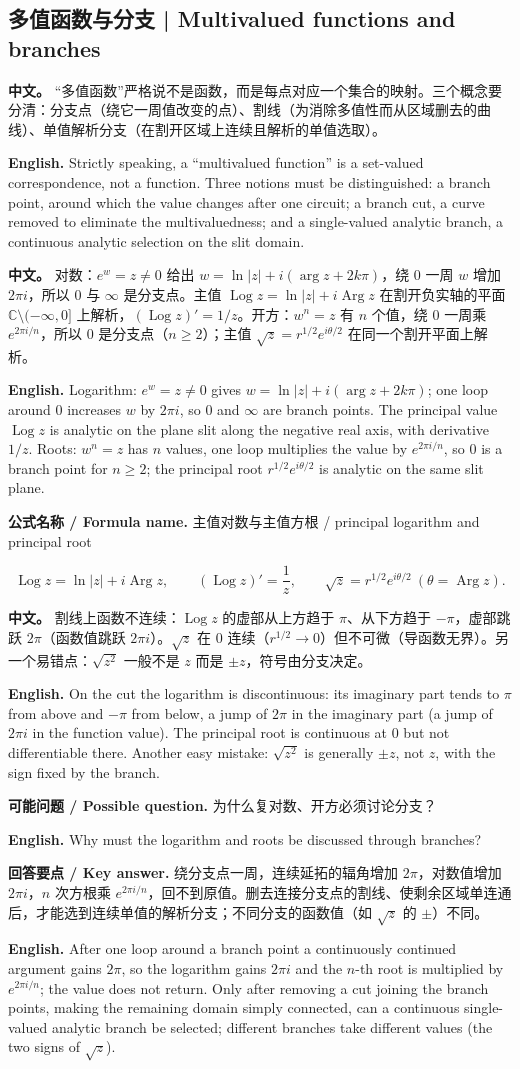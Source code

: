 \documentclass[UTF8,11pt,a4paper]{ctexart}
\newcommand{\EN}[1]{\par\noindent \textbf{English.} #1\par}
\newcommand{\FORMULA}[2]{\par\noindent\textbf{公式名称 / Formula name.} #1 / #2\par}
\newcommand{\ASK}[4]{\par\noindent \textbf{可能问题 / Possible question.} #1\par\EN{#2}\noindent \textbf{回答要点 / Key answer.} #3\par\EN{#4}\medskip}
\newcommand{\APS}[2]{\par\noindent\textbf{中文。} #1\par\noindent\textbf{English.} #2\par\smallskip}
\begin{document}
\subsection{多值函数与分支 | Multivalued functions and branches}
\APS{“多值函数”严格说不是函数，而是每点对应一个集合的映射。三个概念要分清：分支点（绕它一周值改变的点）、割线（为消除多值性而从区域删去的曲线）、单值解析分支（在割开区域上连续且解析的单值选取）。}{Strictly speaking, a ``multivalued function'' is a set-valued correspondence, not a function. Three notions must be distinguished: a branch point, around which the value changes after one circuit; a branch cut, a curve removed to eliminate the multivaluedness; and a single-valued analytic branch, a continuous analytic selection on the slit domain.}
\APS{对数：$e^w=z\ne0$ 给出 $w=\ln|z|+i(\arg z+2k\pi)$，绕 $0$ 一周 $w$ 增加 $2\pi i$，所以 $0$ 与 $\infty$ 是分支点。主值 $\operatorname{Log}z=\ln|z|+i\operatorname{Arg}z$ 在割开负实轴的平面 $\mathbb C\setminus(-\infty,0]$ 上解析，$(\operatorname{Log}z)'=1/z$。开方：$w^n=z$ 有 $n$ 个值，绕 $0$ 一周乘 $e^{2\pi i/n}$，所以 $0$ 是分支点（$n\ge2$）；主值 $\sqrt z=r^{1/2}e^{i\theta/2}$ 在同一个割开平面上解析。}{Logarithm: $e^w=z\ne0$ gives $w=\ln|z|+i(\arg z+2k\pi)$; one loop around $0$ increases $w$ by $2\pi i$, so $0$ and $\infty$ are branch points. The principal value $\operatorname{Log}z$ is analytic on the plane slit along the negative real axis, with derivative $1/z$. Roots: $w^n=z$ has $n$ values, one loop multiplies the value by $e^{2\pi i/n}$, so $0$ is a branch point for $n\ge2$; the principal root $r^{1/2}e^{i\theta/2}$ is analytic on the same slit plane.}
\FORMULA{主值对数与主值方根}{principal logarithm and principal root}
\[
\operatorname{Log}z=\ln|z|+i\operatorname{Arg}z,\qquad (\operatorname{Log}z)'=\frac1z,\qquad
\sqrt z=r^{1/2}e^{i\theta/2}\ (\theta=\operatorname{Arg}z).
\]
\APS{割线上函数不连续：$\operatorname{Log}z$ 的虚部从上方趋于 $\pi$、从下方趋于 $-\pi$，虚部跳跃 $2\pi$（函数值跳跃 $2\pi i$）。$\sqrt z$ 在 $0$ 连续（$r^{1/2}\to0$）但不可微（导函数无界）。另一个易错点：$\sqrt{z^2}$ 一般不是 $z$ 而是 $\pm z$，符号由分支决定。}{On the cut the logarithm is discontinuous: its imaginary part tends to $\pi$ from above and $-\pi$ from below, a jump of $2\pi$ in the imaginary part (a jump of $2\pi i$ in the function value). The principal root is continuous at $0$ but not differentiable there. Another easy mistake: $\sqrt{z^2}$ is generally $\pm z$, not $z$, with the sign fixed by the branch.}
\ASK{为什么复对数、开方必须讨论分支？}{Why must the logarithm and roots be discussed through branches?}{绕分支点一周，连续延拓的辐角增加 $2\pi$，对数值增加 $2\pi i$，$n$ 次方根乘 $e^{2\pi i/n}$，回不到原值。删去连接分支点的割线、使剩余区域单连通后，才能选到连续单值的解析分支；不同分支的函数值（如 $\sqrt z$ 的 $\pm$）不同。}{After one loop around a branch point a continuously continued argument gains $2\pi$, so the logarithm gains $2\pi i$ and the $n$-th root is multiplied by $e^{2\pi i/n}$; the value does not return. Only after removing a cut joining the branch points, making the remaining domain simply connected, can a continuous single-valued analytic branch be selected; different branches take different values (the two signs of $\sqrt z$).}
\end{document}
